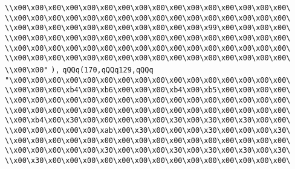 \verb|\\x00\x00\x00\x00\x00\x00\x00\x00\x00\x00\x00\x00\x00\x00\x00\x00\|\newline
\verb|\\x00\x00\x00\x00\x00\x00\x00\x00\x00\x00\x00\x00\x00\x00\x00\x00\|\newline
\verb|\\x00\x00\x00\x00\x00\x00\x00\x00\x00\x00\x00\x99\x00\x00\x00\x00\|\newline
\verb|\\x00\x00\x00\x00\x00\x00\x00\x00\x00\x00\x00\x00\x00\x00\x00\x00\|\newline
\verb|\\x00\x00\x00\x00\x00\x00\x00\x00\x00\x00\x00\x00\x00\x00\x00\x00\|\newline
\verb|\\x00\x00\x00\x00\x00\x00\x00\x00\x00\x00\x00\x00\x00\x00\x00\x00\|\newline
\verb|\\x00\x00"|\newline
\verb|),|\newline
\verb|qQQq(170,qQQq129,qQQq|\newline
\verb|"\x00\x00\x00\x00\x00\x00\x00\x00\x00\x00\x00\x00\x00\x00\x00\x00\|\newline
\verb|\\x00\x00\x00\xb4\x00\xb6\x00\x00\x00\xb4\x00\xb5\x00\x00\x00\x00\|\newline
\verb|\\x00\x00\x00\x00\x00\x00\x00\x00\x00\x00\x00\x00\x00\x00\x00\x00\|\newline
\verb|\\x00\x00\x00\x00\x00\x00\x00\x00\x00\x00\x00\x00\x00\x00\x00\x00\|\newline
\verb|\\x00\xb4\x00\x30\x00\x00\x00\x00\x00\x30\x00\x30\x00\x30\x00\x00\|\newline
\verb|\\x00\x00\x00\x00\x00\xab\x00\x30\x00\x00\x00\x30\x00\x00\x00\x30\|\newline
\verb|\\x00\x00\x00\x00\x00\x00\x00\x00\x00\x00\x00\x00\x00\x00\x00\x00\|\newline
\verb|\\x00\x00\x00\x00\x00\x30\x00\x00\x00\x30\x00\x30\x00\x30\x00\x30\|\newline
\verb|\\x00\x30\x00\x00\x00\x00\x00\x00\x00\x00\x00\x00\x00\x00\x00\x00\|\newline
